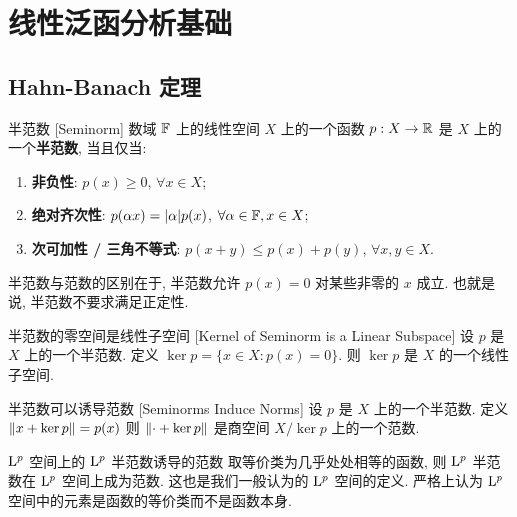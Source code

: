 \section{线性泛函分析基础}

    \subsection{Hahn-Banach 定理}

        \begin{dfn}
            [seminorm]
            {半范数}
            [Seminorm]
            数域 \(\operatorname{\mathbb{F}}\) 上的线性空间 \(X\) 上的一个函数 \(p:X\to\operatorname{\mathbb{R}}\) 是 \(X\) 上的一个\textbf{半范数}, 当且仅当:
            \begin{enumerate}[label=(\roman*)]
                \item \textbf{非负性}: \(p(x)\geq 0\), \(\forall x\in X\);
                \item \textbf{绝对齐次性}: \(p(\alpha x)=\abs{\alpha}p(x)\), \(\forall \alpha\in\operatorname{\mathbb{F}}, x\in X\);
                \item \textbf{次可加性 / 三角不等式}: \(p(x+y)\leq p(x)+p(y)\), \(\forall x,y\in X\).
            \end{enumerate}
        \end{dfn}

        \begin{rmk}
            [Dedicatia]
            半范数与范数的区别在于, 半范数允许 \(p(x)=0\) 对某些非零的 \(x\) 成立. 也就是说, 半范数不要求满足正定性.
        \end{rmk}

        \begin{ppt}
            {半范数的零空间是线性子空间}
            [Kernel of Seminorm is a Linear Subspace]
            设 \(p\) 是 \(X\) 上的一个半范数. 定义 \(\ker p=\{x\in X: p(x)=0\}\). 则 \(\ker p\) 是 \(X\) 的一个线性子空间.
        \end{ppt}

        \begin{ppt}
            {半范数可以诱导范数}
            [Seminorms Induce Norms]
            设 \(p\) 是 \(X\) 上的一个半范数. 定义
            \(\norm{x + \ker p} = p(x)\)
            则 \(\norm{\cdot + \ker p}\) 是商空间 \(X/\ker p\) 上的一个范数.
        \end{ppt}

        \begin{ins}
            {\(\Lp\) 空间上的 \(\Lp\) 半范数诱导的范数}
            取等价类为几乎处处相等的函数, 则 $\Lp$ 半范数在 $\Lp$ 空间上成为范数. 这也是我们一般认为的 $\Lp$ 空间的定义. 严格上认为 \(\Lp\) 空间中的元素是函数的等价类而不是函数本身.
        \end{ins}

